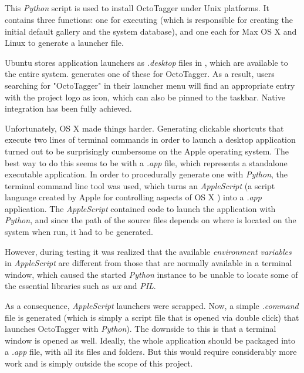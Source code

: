 \subsection{}
\label{sub:mod:install}
\def\kapitelautor{Erik Ritschl}

This \emph{Python} script is used to install OctoTagger under Unix platforms. It contains three functions: one for executing  (which is responsible for creating the initial default gallery and the system database), and one each for Max OS X and Linux to generate a launcher file.

Ubuntu stores application launchers as \emph{.desktop} files  in , which are available to the entire system.  generates one of these for OctoTagger. As a result, users searching for "OctoTagger" in their launcher menu will find an appropriate entry with the project logo as icon, which can also be pinned to the taskbar. Native integration has been fully achieved.

Unfortunately, OS X made things harder. Generating clickable shortcuts that execute two lines of terminal commands in order to launch a desktop application turned out to be surprisingly cumbersome on the Apple operating system. The best way to do this seems to be with a \emph{.app} file, which represents a standalone executable application. In order to procedurally generate one with \emph{Python}, the terminal command line tool  \cite{osacompile} was used, which turns an \emph{AppleScript} (a script language created by Apple for controlling aspects of OS X \cite{AppleScript}) into a \emph{.app} application. The \emph{AppleScript} contained code to launch the application with \emph{Python}, and since the path of the source files depends on where  is located on the system when run, it had to be generated. 

However, during testing it was realized that the available \emph{environment variables} \cite{EnvironmentVariables} in \emph{AppleScript} are different from those that are normally available in a terminal window, which caused the started \emph{Python} instance to be unable to locate some of the essential libraries such as \emph{wx} and \emph{PIL}.

As a consequence, \emph{AppleScript} launchers were scrapped. Now, a simple \emph{.command} file is generated (which is simply a script file that is opened via double click) that launches OctoTagger with \emph{Python}). The downside to this is that a terminal window is opened as well. Ideally, the whole application should be packaged into a \emph{.app} file, with all its files and folders. But this would require considerably more work and is simply outside the scope of this project.